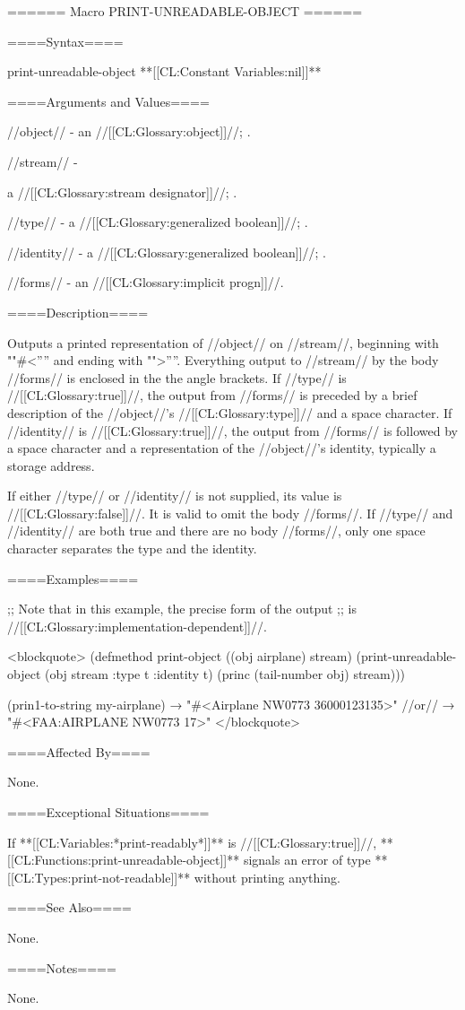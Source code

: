 ====== Macro PRINT-UNREADABLE-OBJECT ======

====Syntax====

\DefmacWithValues print-unreadable-object { } {**[[CL:Constant Variables:nil]]**}

====Arguments and Values====

//object// - an //[[CL:Glossary:object]]//; \eval.

//stream// -

a //[[CL:Glossary:stream designator]]//; \eval.

//type// - a //[[CL:Glossary:generalized boolean]]//; \eval.

//identity// - a //[[CL:Glossary:generalized boolean]]//; \eval.

//forms// - an //[[CL:Glossary:implicit progn]]//.

====Description====

Outputs a printed representation of //object// on //stream//, beginning with ""#<'''' and ending with "">''''. Everything output to //stream// by the body //forms// is enclosed in the the angle brackets. If //type// is //[[CL:Glossary:true]]//, the output from //forms// is preceded by a brief description of the //object//'s //[[CL:Glossary:type]]// and a space character. If //identity// is //[[CL:Glossary:true]]//, the output from //forms// is followed by a space character and a representation of the //object//'s identity, typically a storage address.

If either //type// or //identity// is not supplied, its value is //[[CL:Glossary:false]]//. It is valid to omit the body //forms//. If //type// and //identity// are both true and there are no body //forms//, only one space character separates the type and the identity.

====Examples====

;; Note that in this example, the precise form of the output ;; is //[[CL:Glossary:implementation-dependent]]//.

<blockquote> (defmethod print-object ((obj airplane) stream) (print-unreadable-object (obj stream :type t :identity t) (princ (tail-number obj) stream)))

(prin1-to-string my-airplane) → "#<Airplane NW0773 36000123135>" //or// → "#<FAA:AIRPLANE NW0773 17>" </blockquote>

====Affected By====

None.

====Exceptional Situations====

If **[[CL:Variables:*print-readably*]]** is //[[CL:Glossary:true]]//, **[[CL:Functions:print-unreadable-object]]** signals an error of type **[[CL:Types:print-not-readable]]** without printing anything.

====See Also====

None.

====Notes====

None.

